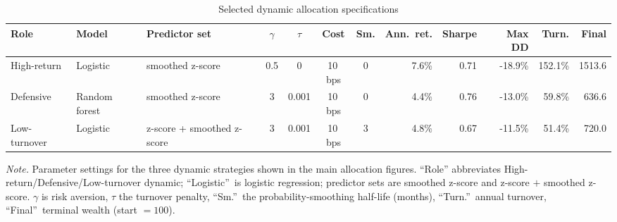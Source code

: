 \begin{table}[!htbp]
\centering
\caption{Selected dynamic allocation specifications}
\label{tab:allocation-selected-strategies}
\small
\setlength{\tabcolsep}{3pt}
\renewcommand{\arraystretch}{1.15}
\begin{adjustbox}{center,max width=\linewidth}
\begin{tabular}{lllccccrrrrr}
\toprule
Role & Model & Predictor set & $\gamma$ & $\tau$ & Cost & Sm. & Ann.\ ret. & Sharpe & Max DD & Turn. & Final \\
\midrule
High-return & Logistic & smoothed z-score & 0.5 & 0 & 10\,bps & 0 & 7.6\% & 0.71 & -18.9\% & 152.1\% & 1513.6 \\
Defensive & Random forest & smoothed z-score & 3 & 0.001 & 10\,bps & 0 & 4.4\% & 0.76 & -13.0\% & 59.8\% & 636.6 \\
Low-turnover & Logistic & z-score + smoothed z-score & 3 & 0.001 & 10\,bps & 3 & 4.8\% & 0.67 & -11.5\% & 51.4\% & 720.0 \\
\bottomrule
\end{tabular}
\end{adjustbox}
\vspace{0.65em}
\begin{minipage}{0.94\linewidth}
\footnotesize
\emph{Note.} Parameter settings for the three dynamic strategies shown in the main allocation figures. ``Role'' abbreviates High-return/Defensive/Low-turnover dynamic; ``Logistic''\ is logistic regression; predictor sets are smoothed z-score and z-score $+$ smoothed z-score. $\gamma$ is risk aversion, $\tau$ the turnover penalty, ``Sm.''\ the probability-smoothing half-life (months), ``Turn.''\ annual turnover, ``Final''\ terminal wealth (start $=100$).
\end{minipage}
\end{table}
